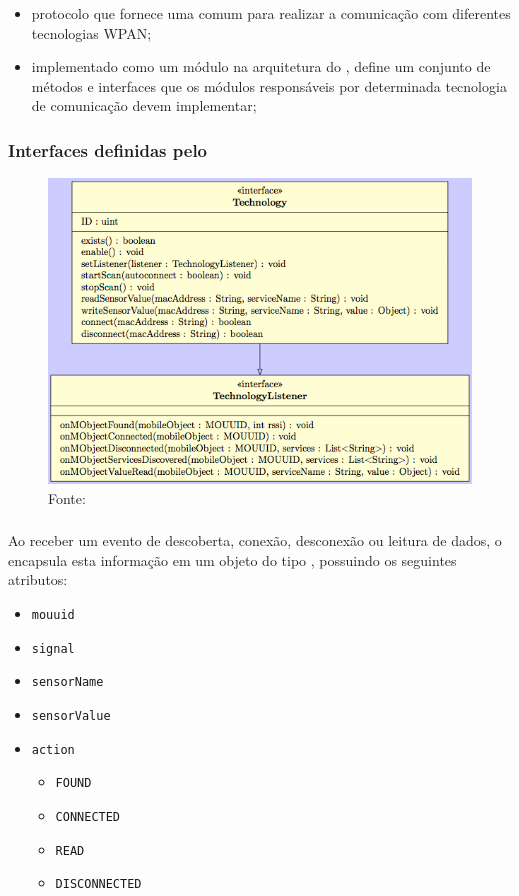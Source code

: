 \documentclass[aspectratio=169]{beamer}
\begin{document}
\begin{frame}
	\frametitle{\stwopa}
	\begin{itemize}
		\item protocolo que fornece uma \api comum para realizar a comunicação com diferentes tecnologias WPAN;

			\bigskip
			
		\item implementado como um módulo na arquitetura do \middleware, define um conjunto de métodos e interfaces que os módulos responsáveis por determinada tecnologia de comunicação devem implementar;
	\end{itemize}
	
\end{frame}

\begin{frame}
	\frametitle{Interfaces definidas pelo \stwopa}
	\begin{figure}[htb]
		\centering
		\includegraphics[width=0.55\linewidth]{img/technology-interface.png}
		\caption{Fonte: \cite{talavera:et-al:2015}}
	\end{figure}
\end{frame}

\begin{frame}
	\frametitle{\sensordata}
	Ao receber um evento de descoberta, conexão, desconexão ou leitura de dados, o \stwopa encapsula esta informação em um objeto do tipo \sensordata, possuindo os seguintes atributos:
	\begin{itemize}
		\item \texttt{mouuid}

		\item \texttt{signal}

		\item \texttt{sensorName}

		\item \texttt{sensorValue}
			
		\item \texttt{action}
		\begin{itemize}

			\item \texttt{FOUND}

			\item \texttt{CONNECTED}

			\item \texttt{READ}

			\item \texttt{DISCONNECTED}

		\end{itemize}
	\end{itemize}
\end{frame}
\end{document}
